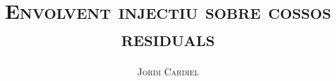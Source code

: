 \documentclass[compress]{article}
\title{\large{\textsc{\textbf{Envolvent injectiu sobre cossos residuals}}}}
\author{\textsc{Jordi Cardiel}}
\date{}
\begin{document}
\maketitle
\tableofcontents
\text{ }\\



\end{document}
